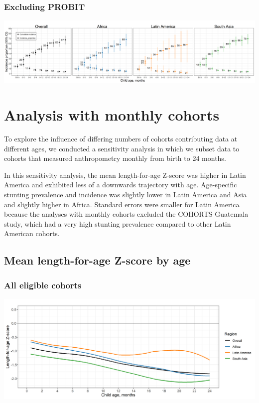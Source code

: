 \documentclass[9pt,]{book}
\begin{document}
\hypertarget{excluding-probit-2}{%
\subsection{Excluding PROBIT}\label{excluding-probit-2}}

\includegraphics[width=66.67in]{figure-copies/fig-stunt-2-inc-overall_region--allage-primary_no_probit}

\hypertarget{monthly}{%
\chapter{Analysis with monthly cohorts}\label{monthly}}

\raggedright

To explore the influence of differing numbers of cohorts contributing data at different ages, we conducted a sensitivity analysis in which we subset data to cohorts that measured anthropometry monthly from birth to 24 months.

In this sensitivity analysis, the mean length-for-age Z-score was higher in Latin America and exhibited less of a downwards trajectory with age. Age-specific stunting prevalence and incidence was slightly lower in Latin America and Asia and slightly higher in Africa. Standard errors were smaller for Latin America because the analyses with monthly cohorts excluded the COHORTS Guatemala study, which had a very high stunting prevalence compared to other Latin American cohorts.

\hypertarget{mean-length-for-age-z-score-by-age-2}{%
\section{Mean length-for-age Z-score by age}\label{mean-length-for-age-z-score-by-age-2}}

\hypertarget{all-eligible-cohorts}{%
\subsection{All eligible cohorts}\label{all-eligible-cohorts}}

\includegraphics[width=41.67in]{figure-copies/fig-laz-2-mean-overall_region--allage-primary}
\end{document}
